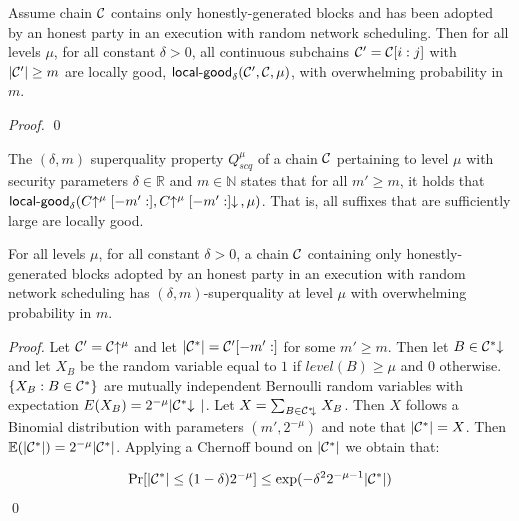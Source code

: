 \begin{lemma}\label{lem.localgood}
Assume chain $\mathcal{C}$ contains only honestly-generated blocks and has been
adopted by an honest party in an execution with random network scheduling. Then
for all levels $\mu$, for all constant $\delta > 0$, all continuous subchains
$\mathcal{C}' = \mathcal{C}[i:j]$ with $|\mathcal{C}'| \geq m$ are locally good,
$\textsf{local-good}_{\delta}(\mathcal{C}', \mathcal{C}, \mu)$, with overwhelming
probability in $m$.
\end{lemma}
\begin{proof}
\qed
\end{proof}

\begin{definition}
The $(\delta, m)$ superquality property
$Q^\mu_{scq}$ of a chain $\mathcal{C}$ pertaining to level $\mu$ with security
parameters $\delta \in \mathbb{R}$ and $m \in \mathbb{N}$ states that for all
$m' \geq m$, it holds that $\textsf{local-good}_{\delta}(C\negthickspace\uparrow^\mu[-m':],
C\negthickspace\uparrow^\mu[-m':]\negthickspace\downarrow\,, \mu)$. That is, all suffixes that are
sufficiently large are locally good.
\end{definition}

\begin{lemma}[Superquality]\label{lem.superquality}
For all levels $\mu$, for all constant $\delta > 0$, a chain
$\mathcal{C}$ containing only honestly-generated blocks adopted by an honest party in
an execution with random network scheduling has $(\delta, m)$-superquality at level
$\mu$ with overwhelming probability in $m$.
\end{lemma}

\begin{proof}
Let $\mathcal{C}' = \mathcal{C}\negthickspace\uparrow^\mu$ and let $|\mathcal{C}^*| =
\mathcal{C}'[-m':]$ for some $m' \geq m$. Then let $B \in \mathcal{C}^*\negthickspace\downarrow\,$ and let
$X_B$ be the random variable equal to $1$ if $\textit{level}(B) \geq \mu$ and
$0$ otherwise. $\{ X_B: B \in \mathcal{C}^* \}$ are mutually independent Bernoulli
random variables with expectation $E(X_B) = 2^{-\mu}|\mathcal{C}^*\negthickspace\downarrow\,|$. Let
$X = \sum_{B \in \mathcal{C}^*\negthickspace\downarrow\,}{X_B}$. Then $X$ follows a Binomial
distribution with parameters $(m', 2^{-\mu})$ and note that $|\mathcal{C}^*| = X$.
Then $\mathbb{E}(|\mathcal{C}^*|) = 2^{-\mu}|\mathcal{C}^*|$. Applying a Chernoff bound on
$|\mathcal{C}^*|$ we obtain that:

\begin{equation*}
\Pr[|\mathcal{C}^*| \leq (1 - \delta)2^{-\mu}] \leq
\exp(-\delta^2 2^{-\mu-1}|\mathcal{C}^*|)
\end{equation*}
\qed
\end{proof}

